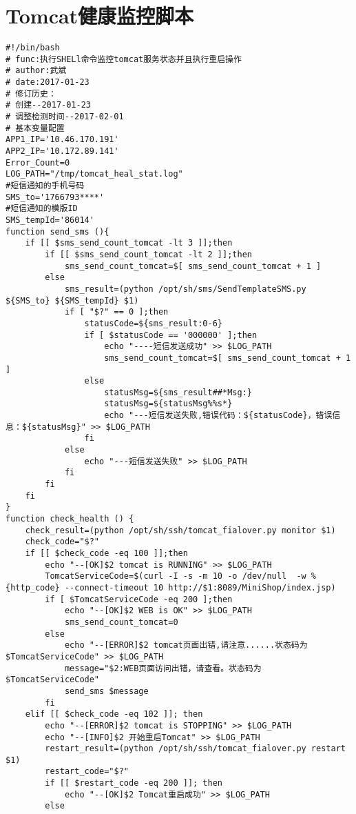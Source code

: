 \chapter{Tomcat健康监控脚本}
\label{cha:Tomcathealth}
\begin{lstlisting}[numbers=none]
#!/bin/bash
# func:执行SHELl命令监控tomcat服务状态并且执行重启操作
# author:武斌
# date:2017-01-23
# 修订历史：
# 创建--2017-01-23
# 调整检测时间--2017-02-01
# 基本变量配置
APP1_IP='10.46.170.191'
APP2_IP='10.172.89.141'
Error_Count=0
LOG_PATH="/tmp/tomcat_heal_stat.log"
#短信通知的手机号码
SMS_to='1766793****'
#短信通知的模版ID
SMS_tempId='86014'
function send_sms (){
    if [[ $sms_send_count_tomcat -lt 3 ]];then
        if [[ $sms_send_count_tomcat -lt 2 ]];then
            sms_send_count_tomcat=$[ sms_send_count_tomcat + 1 ]
        else
            sms_result=(python /opt/sh/sms/SendTemplateSMS.py ${SMS_to} ${SMS_tempId} $1)
            if [ "$?" == 0 ];then
                statusCode=${sms_result:0-6}
                if [ $statusCode == '000000' ];then
                    echo "----短信发送成功" >> $LOG_PATH
                    sms_send_count_tomcat=$[ sms_send_count_tomcat + 1 ]
                else
                    statusMsg=${sms_result##*Msg:}
                    statusMsg=${statusMsg%%s*}
                    echo "---短信发送失败,错误代码：${statusCode}，错误信息：${statusMsg}" >> $LOG_PATH
                fi
            else
                echo "---短信发送失败" >> $LOG_PATH
            fi
        fi
    fi
}
function check_health () {
    check_result=(python /opt/sh/ssh/tomcat_fialover.py monitor $1)
    check_code="$?"
    if [[ $check_code -eq 100 ]];then
        echo "--[OK]$2 tomcat is RUNNING" >> $LOG_PATH
        TomcatServiceCode=$(curl -I -s -m 10 -o /dev/null  -w %{http_code} --connect-timeout 10 http://$1:8089/MiniShop/index.jsp)
        if [ $TomcatServiceCode -eq 200 ];then
            echo "--[OK]$2 WEB is OK" >> $LOG_PATH
            sms_send_count_tomcat=0
        else
            echo "--[ERROR]$2 tomcat页面出错,请注意......状态码为$TomcatServiceCode" >> $LOG_PATH
            message="$2:WEB页面访问出错，请查看。状态码为$TomcatServiceCode"
            send_sms $message
        fi
    elif [[ $check_code -eq 102 ]]; then
        echo "--[ERROR]$2 tomcat is STOPPING" >> $LOG_PATH
        echo "--[INFO]$2 开始重启Tomcat" >> $LOG_PATH
        restart_result=(python /opt/sh/ssh/tomcat_fialover.py restart $1)
        restart_code="$?"
        if [[ $restart_code -eq 200 ]]; then
            echo "--[OK]$2 Tomcat重启成功" >> $LOG_PATH
        else

\end{lstlisting}
